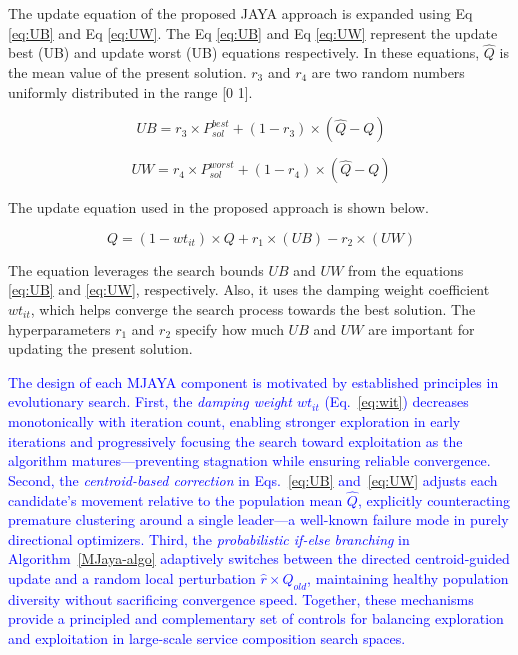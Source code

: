 \documentclass[3p,twocolumn]{elsarticle}
\theoremstyle{thmstyleone}%
\theoremstyle{thmstyletwo}%
\theoremstyle{thmstylethree}%
\begin{document}
The update equation of the proposed JAYA approach is expanded using Eq \ref{eq:UB} and Eq \ref{eq:UW}. The Eq \ref{eq:UB} and Eq \ref{eq:UW} represent the update best (UB) and update worst (UB) equations respectively. In these equations, $\hat{Q}$ is the mean value of the present solution. $r_3$ and $r_4$ are two random numbers uniformly distributed in the range [0 1].

\begin{equation} \label{eq:UB} 
\ UB= r_3 \times P_{sol}^{best}+ (1-r_3) \times (\hat{Q} -Q)
\end{equation}

\begin{equation} \label{eq:UW} 
\ UW= r_4 \times P_{sol}^{worst}+ (1-r_4) \times (\hat{Q} -Q)
\end{equation}

The update equation used in the proposed approach is shown below.


\begin{equation} \label{eq:updateEq}
\ Q = (1-wt_{it}) \times Q + r_1 \times (UB) - r_2 \times  (UW)
\end{equation}


The equation leverages the search bounds $UB$ and $UW$ from the equations \ref{eq:UB}
 and \ref{eq:UW}, respectively. Also, it uses the damping weight coefficient $wt_{it}$, which helps converge the search process towards the best solution. The hyperparameters $r_1$ and $r_2$ specify how much $UB$ and $UW$ are important for updating the present solution.

 \textcolor{blue}{
The design of each MJAYA component is motivated by established principles in evolutionary search. First, the \textit{damping weight $wt_{it}$} (Eq.~\ref{eq:wit}) decreases monotonically with iteration count, enabling stronger exploration in early iterations and progressively focusing the search toward exploitation as the algorithm matures---preventing stagnation while ensuring reliable convergence. Second, the \textit{centroid-based correction} in Eqs.~\ref{eq:UB} and~\ref{eq:UW} adjusts each candidate's movement relative to the population mean $\hat{Q}$, explicitly counteracting premature clustering around a single leader---a well-known failure mode in 
purely directional optimizers. Third, the \textit{probabilistic if-else branching} in Algorithm~\ref{MJaya-algo} adaptively switches between the directed centroid-guided update and a random local perturbation $\hat{r} \times Q_{old}$, maintaining healthy population diversity without sacrificing convergence speed. Together, these mechanisms provide a principled and complementary set of controls for balancing exploration and exploitation in large-scale service composition search spaces.}
\end{document}

